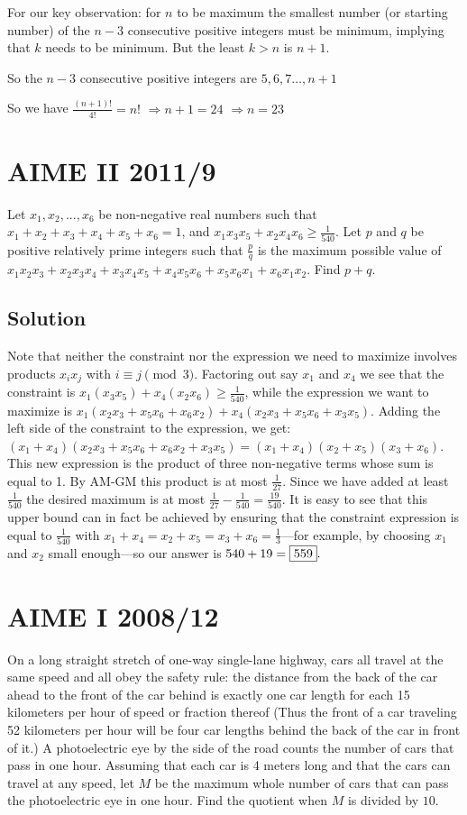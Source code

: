 \documentclass[blue,onecol]{shooting}
\begin{document}
For our key observation: for $n$ to be maximum the smallest number (or starting number) of the $n-3$ consecutive positive integers must be minimum, implying that $k$ needs to be minimum. But the least $k > n$ is $n+1$.

So the $n-3$ consecutive positive integers are $5, 6, 7…, n+1$

So we have $\frac{(n+1)!}{4!} = n!$ $\Longrightarrow  n+1 = 24$ $\Longrightarrow  n = 23$
\section{AIME II 2011/9}
Let $x_1, x_2, ... , x_6$ be non-negative real numbers such that $x_1 +x_2 +x_3 +x_4 +x_5 +x_6 =1$, and $x_1 x_3 x_5 +x_2 x_4 x_6 \ge {\scriptstyle\frac{1}{540}}$. Let $p$ and $q$ be positive relatively prime integers such that $\frac{p}{q}$ is the maximum possible value of $x_1 x_2 x_3 + x_2 x_3 x_4 +x_3 x_4 x_5 +x_4 x_5 x_6 +x_5 x_6 x_1 +x_6 x_1 x_2$. Find $p+q$.
\subsection{Solution}
Note that neither the constraint nor the expression we need to maximize involves products $x_i x_j$ with $i \equiv j \pmod 3$. Factoring out say $x_1$ and $x_4$ we see that the constraint is $x_1(x_3x_5) + x_4(x_2x_6) \ge {\scriptstyle\frac1{540}}$, while the expression we want to maximize is $x_1(x_2x_3 + x_5x_6 + x_6x_2) + x_4(x_2x_3 + x_5x_6 + x_3x_5)$. Adding the left side of the constraint to the expression, we get: $(x_1 + x_4)(x_2x_3 + x_5x_6 + x_6x_2 + x_3x_5) = (x_1 + x_4)(x_2 + x_5)(x_3 + x_6)$. This new expression is the product of three non-negative terms whose sum is equal to 1. By AM-GM this product is at most $\scriptstyle\frac1{27}$. Since we have added at least $\scriptstyle\frac1{540}$ the desired maximum is at most $\scriptstyle\frac1{27} - \frac1{540} = \frac{19}{540}$. It is easy to see that this upper bound can in fact be achieved by ensuring that the constraint expression is equal to $\scriptstyle\frac1{540}$ with $x_1 + x_4 = x_2 + x_5 = x_3 + x_6 = \scriptstyle\frac13$—for example, by choosing $x_1$ and $x_2$ small enough—so our answer is $540 + 19 = \fbox{559}.$
\section{AIME I 2008/12}
On a long straight stretch of one-way single-lane highway, cars all travel at the same speed and all obey the safety rule: the distance from the back of the car ahead to the front of the car behind is exactly one car length for each 15 kilometers per hour of speed or fraction thereof (Thus the front of a car traveling 52 kilometers per hour will be four car lengths behind the back of the car in front of it.) A photoelectric eye by the side of the road counts the number of cars that pass in one hour. Assuming that each car is 4 meters long and that the cars can travel at any speed, let $M$ be the maximum whole number of cars that can pass the photoelectric eye in one hour. Find the quotient when $M$ is divided by $10$.
\end{document}
